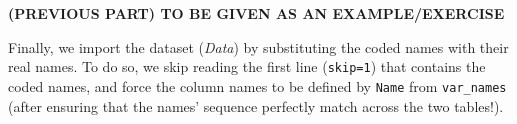 \documentclass[
]{book}
\newenvironment{Shaded}{\begin{snugshade}}{\end{snugshade}}
\newcommand{\AttributeTok}[1]{\textcolor[rgb]{0.77,0.63,0.00}{#1}}
\newcommand{\DecValTok}[1]{\textcolor[rgb]{0.00,0.00,0.81}{#1}}
\newcommand{\FunctionTok}[1]{\textcolor[rgb]{0.00,0.00,0.00}{#1}}
\newcommand{\NormalTok}[1]{#1}
\newcommand{\OtherTok}[1]{\textcolor[rgb]{0.56,0.35,0.01}{#1}}
\newcommand{\SpecialCharTok}[1]{\textcolor[rgb]{0.00,0.00,0.00}{#1}}
\newcommand{\StringTok}[1]{\textcolor[rgb]{0.31,0.60,0.02}{#1}}
\begin{document}
\textbf{(PREVIOUS PART) TO BE GIVEN AS AN EXAMPLE/EXERCISE}

Finally, we import the dataset (\emph{Data}) by substituting the coded names with their real names.
To do so, we skip reading the first line (\texttt{skip=1}) that contains the coded names, and force the column names to be defined by \texttt{Name} from \texttt{var\_names} (after ensuring that the names' sequence perfectly match across the two tables!).

\begin{Shaded}
\end{Shaded}
\end{document}
